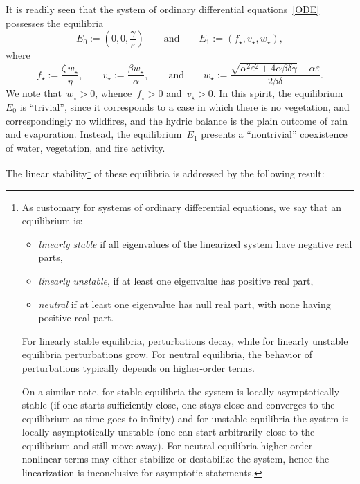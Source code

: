 \documentclass[12pt]{amsart}
\renewcommand{\epsilon}{\varepsilon}
\numberwithin{equation}{section}
\begin{document}
It is readily seen that the system of ordinary differential equations~\eqref{ODE} possesses the equilibria
\[
E_0 := \left(0, 0, \frac{\gamma}{\epsilon}\right)
\qquad{\mbox{and}}\qquad
E_1:=\left( f_\star,
v_\star , w_\star\right),\]
where\begin{equation}\label{EQSTvdARDAF23-4}
f_\star:=\frac{\zeta\,w_\star}{\eta},\qquad
v_\star:=\frac{\beta w_\star}{\alpha},\qquad{\mbox{and}}\qquad
w_\star := \frac{ \sqrt{\alpha^2\epsilon^2 + 4\alpha\beta\delta\gamma}-\alpha\epsilon}{2\beta\delta}.
\end{equation}
We note that~$w_\star>0$,
whence~$f_\star>0$ and~$v_\star>0$. In this spirit, the equilibrium~$E_0$ is ``trivial'',
since it corresponds to a case in which there is no vegetation, and correspondingly no
wildfires, and the hydric balance is the plain outcome of rain and evaporation.
Instead, the equilibrium~$E_1$ presents a ``nontrivial'' coexistence of water, vegetation, and  fire activity.

The linear stability\footnote{As customary for systems of ordinary differential equations,
we say that an equilibrium is:
\begin{itemize}\item
{\em linearly stable} if all eigenvalues 
of the linearized system have negative real parts,
\item {\em
linearly unstable}, if at least one eigenvalue has positive real part,
\item {\em neutral} if
at least one eigenvalue has null real part,
with none having positive real part.
\end{itemize}
For linearly stable equilibria,
perturbations decay, while for linearly unstable equilibria perturbations grow.
For neutral equilibria, the behavior of perturbations typically depends on higher-order terms.

On a similar note, for stable equilibria
the system is locally asymptotically stable (if one starts sufficiently close,
one stays close and converges to the equilibrium as time goes to infinity)
and for unstable equilibria
the system is locally asymptotically unstable (one can start arbitrarily close to the equilibrium and still move away). For neutral equilibria
higher-order nonlinear terms may either stabilize or destabilize the system, hence the linearization is inconclusive for
asymptotic statements.} of these equilibria is addressed by the following result:
\end{document}
